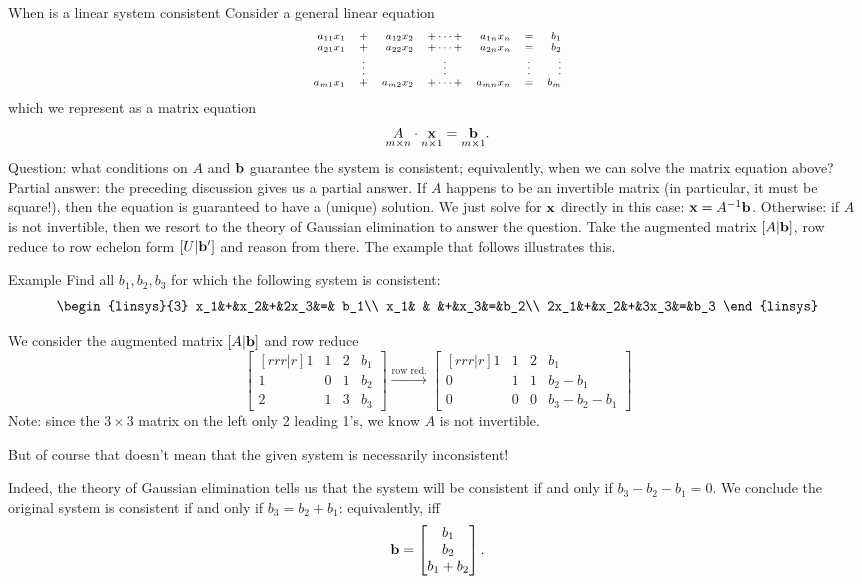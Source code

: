 \begin{frame}{When is a linear system consistent}
Consider a general linear equation 
\[\scriptsize
\begin{array}{rcrcrcr} a_{11}x_{1}&+&a_{12}x_{2}&+\cdots+& a_{1n}x_{n}&=&b_1\\ a_{21}x_{1}&+&a_{22}x_{2}&+\cdots+&a_{2n}x_{n}&=&b_2\\ &\vdots& &\vdots & &\vdots & \vdots\\ a_{m1}x_{1}&+&a_{m2}x_{2}&+\cdots +&a_{mn}x_{n}&=&b_m \end{array}
\]
which we represent as a matrix equation 
\[
\underset{m\times n}{A}\cdot \underset{{n\times 1}}{{\mathbf x}}=\underset{m\times 1}{{\mathbf b}}.
\]
\alert{Question:} what conditions on $A$ and ${\mathbf b}$ guarantee the system is consistent; equivalently, when we can solve the matrix equation above? 
\bpause
\alert{Partial answer:} the preceding discussion gives us a partial answer. If $A$ happens to be an \alert{invertible matrix} (in particular, it must be square!), then the equation is guaranteed to have a (unique) solution. We just solve for ${\mathbf x}$ directly in this case: ${\mathbf x}=A^{-1}{\mathbf b}$.  
\bpause
\alert{Otherwise:} if $A$ is not invertible, then we resort to the theory of Gaussian elimination to answer the question. Take the augmented matrix $[A \vert {\mathbf b}]$, row reduce to row echelon form $[U\vert {\mathbf b}']$ and reason from there. The example that follows illustrates this. 
\end{frame}
\begin{frame}{Example} 
Find all $b_1,b_2,b_3$ for which the following system is consistent: 
\[
\begin{linsys}{3}
x_1&+&x_2&+&2x_3&=& b_1\\
x_1& & &+&x_3&=&b_2\\
2x_1&+&x_2&+&3x_3&=&b_3
\end{linsys}
\]
\pause
\begin{bsolution}
We consider the augmented matrix $[A \vert {\mathbf b}]$ and row reduce 
\[
\begin{bmatrix}[rrr|r]
1&1&2&b_1\\ 1&0&1&b_2\\ 2&1&3&b_3
\end{bmatrix}
\xrightarrow{\text{row red.}} \begin{bmatrix}[rrr|r]
\boxed{1}&1&2&b_1\\ 0&\boxed{1}&1&b_2-b_1\\ 0&0&0&b_3-b_2-b_1
\end{bmatrix}
\]
\pause 
Note: since the $3\times 3$ matrix on the left only 2 leading 1's, we know $A$ is not invertible. 

But of course that doesn't mean that the given system is necessarily inconsistent!  

Indeed, the theory of Gaussian elimination tells us that the system will be consistent if and only if $b_3-b_2-b_1=0$. 
\bpause
We conclude the original system is consistent if and only if $b_3=b_2+b_1$: equivalently, iff 
\[
{\mathbf b}=\begin{bmatrix}
b_1\\b_2\\b_1+b_2
\end{bmatrix}.
\]
\end{bsolution}
\end{frame}
